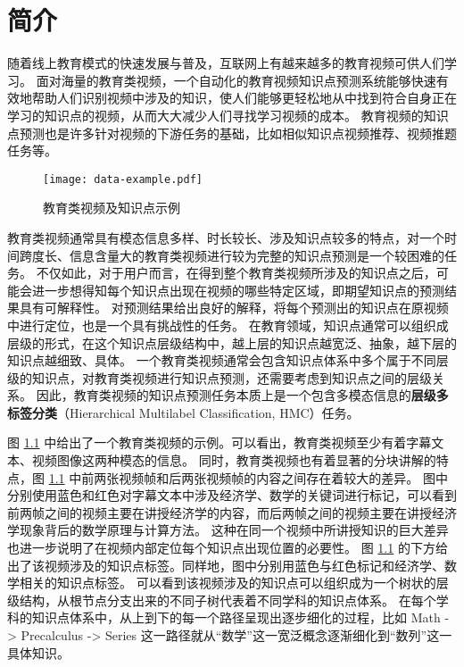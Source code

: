 
\chapter{简介}
    随着线上教育模式的快速发展与普及，互联网上有越来越多的教育视频可供人们学习。
    面对海量的教育类视频，一个自动化的教育视频知识点预测系统能够快速有效地帮助人们识别视频中涉及的知识，使人们能够更轻松地从中找到符合自身正在学习的知识点的视频，从而大大减少人们寻找学习视频的成本。
    教育视频的知识点预测也是许多针对视频的下游任务的基础，比如相似知识点视频推荐、视频推题任务等。

    \begin{figure}[t]
        \centering
        \texttt{[image: data-example.pdf]}
        \caption{教育类视频及知识点示例}
        \label{fig1.1}
    \end{figure}

    教育类视频通常具有模态信息多样、时长较长、涉及知识点较多的特点，对一个时间跨度长、信息含量大的教育类视频进行较为完整的知识点预测是一个较困难的任务。
    不仅如此，对于用户而言，在得到整个教育类视频所涉及的知识点之后，可能会进一步想得知每个知识点出现在视频的哪些特定区域，即期望知识点的预测结果具有可解释性。
    对预测结果给出良好的解释，将每个预测出的知识点在原视频中进行定位，也是一个具有挑战性的任务。
    在教育领域，知识点通常可以组织成层级的形式，在这个知识点层级结构中，越上层的知识点越宽泛、抽象，越下层的知识点越细致、具体。
    一个教育类视频通常会包含知识点体系中多个属于不同层级的知识点，对教育类视频进行知识点预测，还需要考虑到知识点之间的层级关系。
    因此，教育类视频的知识点预测任务本质上是一个包含多模态信息的\textbf{层级多标签分类}（Hierarchical Multilabel Classification, HMC）任务。

    图 \ref{fig1.1} 中给出了一个教育类视频的示例。可以看出，教育类视频至少有着字幕文本、视频图像这两种模态的信息。
    同时，教育类视频也有着显著的分块讲解的特点，图 \ref{fig1.1} 中前两张视频帧和后两张视频帧的内容之间存在着较大的差异。
    图中分别使用蓝色和红色对字幕文本中涉及经济学、数学的关键词进行标记，可以看到前两帧之间的视频主要在讲授经济学的内容，而后两帧之间的视频主要在讲授经济学现象背后的数学原理与计算方法。
    这种在同一个视频中所讲授知识的巨大差异也进一步说明了在视频内部定位每个知识点出现位置的必要性。
    图 \ref{fig1.1} 的下方给出了该视频涉及的知识点标签。同样地，图中分别用蓝色与红色标记和经济学、数学相关的知识点标签。
    可以看到该视频涉及的知识点可以组织成为一个树状的层级结构，从根节点分支出来的不同子树代表着不同学科的知识点体系。
    在每个学科的知识点体系中，从上到下的每一个路径呈现出逐步细化的过程，比如 Math -> Precalculus -> Series 这一路径就从“数学”这一宽泛概念逐渐细化到“数列”这一具体知识。

